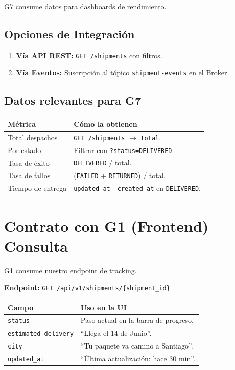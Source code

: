 \documentclass[11pt, a4paper]{article}
\begin{document}
G7 consume datos para dashboards de rendimiento.

\subsection{Opciones de Integración}

\begin{enumerate}[noitemsep]
  \item \textbf{Vía API REST:} \texttt{GET /shipments} con filtros.
  \item \textbf{Vía Eventos:} Suscripción al tópico \texttt{shipment-events} en el Broker.
\end{enumerate}

\subsection{Datos relevantes para G7}

\begin{table}[h!]
\centering
\renewcommand{\arraystretch}{1.3}
\begin{tabularx}{\textwidth}{l X}
  \toprule
  \textbf{Métrica} & \textbf{Cómo la obtienen} \\
  \midrule
  Total despachos       & \texttt{GET /shipments} $\rightarrow$ \texttt{total}. \\
  Por estado            & Filtrar con \texttt{?status=DELIVERED}. \\
  Tasa de éxito         & \texttt{DELIVERED} / total. \\
  Tasa de fallos        & (\texttt{FAILED} + \texttt{RETURNED}) / total. \\
  Tiempo de entrega     & \texttt{updated\_at} - \texttt{created\_at} en \texttt{DELIVERED}. \\
  \bottomrule
\end{tabularx}
\end{table}


\section{Contrato con G1 (Frontend) --- Consulta}

G1 consume nuestro endpoint de tracking.

\textbf{Endpoint:} \texttt{GET /api/v1/shipments/\{shipment\_id\}}

\begin{table}[h!]
\centering
\renewcommand{\arraystretch}{1.3}
\begin{tabularx}{\textwidth}{l X}
  \toprule
  \textbf{Campo} & \textbf{Uso en la UI} \\
  \midrule
  \texttt{status}              & Paso actual en la barra de progreso. \\
  \texttt{estimated\_delivery} & ``Llega el 14 de Junio''. \\
  \texttt{city}                & ``Tu paquete va camino a Santiago''. \\
  \texttt{updated\_at}         & ``Última actualización: hace 30 min''. \\
  \bottomrule
\end{tabularx}
\end{table}
\end{document}
